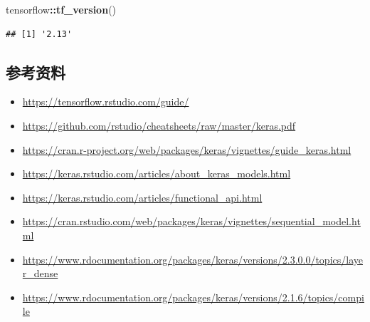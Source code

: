 \documentclass[
]{article}
\newenvironment{Shaded}{\begin{snugshade}}{\end{snugshade}}
\newcommand{\FunctionTok}[1]{\textcolor[rgb]{0.13,0.29,0.53}{\textbf{#1}}}
\newcommand{\NormalTok}[1]{#1}
\newcommand{\SpecialCharTok}[1]{\textcolor[rgb]{0.81,0.36,0.00}{\textbf{#1}}}
\providecommand{\tightlist}{%
  \setlength{\itemsep}{0pt}\setlength{\parskip}{0pt}}
\begin{document}
\begin{Shaded}
\begin{Highlighting}[]
\NormalTok{tensorflow}\SpecialCharTok{::}\FunctionTok{tf\_version}\NormalTok{()}
\end{Highlighting}
\end{Shaded}

\begin{verbatim}
## [1] '2.13'
\end{verbatim}

\subsection{参考资料}\label{ux53c2ux8003ux8d44ux6599}

\begin{itemize}
\tightlist
\item
  \url{https://tensorflow.rstudio.com/guide/}
\item
  \url{https://github.com/rstudio/cheatsheets/raw/master/keras.pdf}
\item
  \url{https://cran.r-project.org/web/packages/keras/vignettes/guide_keras.html}
\item
  \url{https://keras.rstudio.com/articles/about_keras_models.html}
\item
  \url{https://keras.rstudio.com/articles/functional_api.html}
\item
  \url{https://cran.rstudio.com/web/packages/keras/vignettes/sequential_model.html}
\item
  \url{https://www.rdocumentation.org/packages/keras/versions/2.3.0.0/topics/layer_dense}
\item
  \url{https://www.rdocumentation.org/packages/keras/versions/2.1.6/topics/compile}
\end{itemize}
\end{document}
